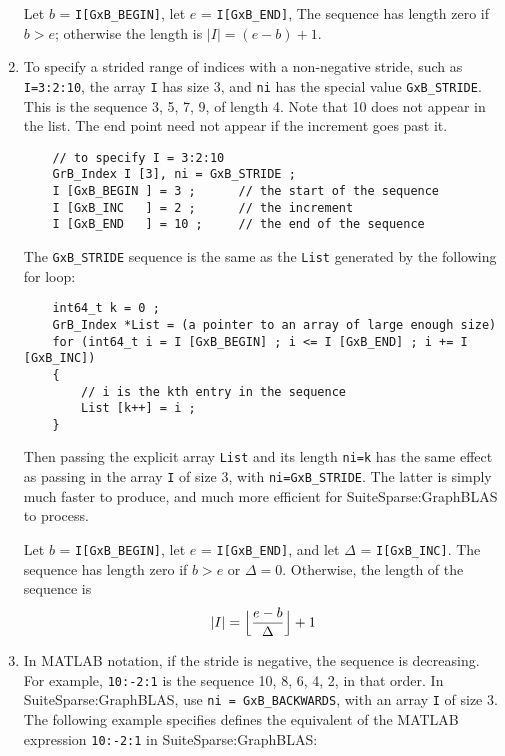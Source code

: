 \documentclass[12pt]{article}
\begin{document}
\begin{enumerate}
    \vspace{-0.05in}
    Let $b$ = \verb'I[GxB_BEGIN]', let $e$ = \verb'I[GxB_END]',
    The sequence has length zero if $b > e$; otherwise the length is
    $|I| = (e-b) + 1$.

\item To specify a strided range of indices with a non-negative stride,
    such as \verb'I=3:2:10', the array \verb'I' has size 3, and \verb'ni' has
    the special value \verb'GxB_STRIDE'.  This is the sequence 3, 5, 7, 9, of
    length 4.  Note that 10 does not appear in the list.  The end point need
    not appear if the increment goes past it.

    \vspace{-0.05in}
    {\footnotesize
    \begin{verbatim}
    // to specify I = 3:2:10
    GrB_Index I [3], ni = GxB_STRIDE ;
    I [GxB_BEGIN ] = 3 ;      // the start of the sequence
    I [GxB_INC   ] = 2 ;      // the increment
    I [GxB_END   ] = 10 ;     // the end of the sequence \end{verbatim}}

    \vspace{-0.05in}
    The \verb'GxB_STRIDE' sequence is the same as the \verb'List' generated by
    the following for loop:

    \vspace{-0.05in}
    {\footnotesize
    \begin{verbatim}
    int64_t k = 0 ;
    GrB_Index *List = (a pointer to an array of large enough size)
    for (int64_t i = I [GxB_BEGIN] ; i <= I [GxB_END] ; i += I [GxB_INC])
    {
        // i is the kth entry in the sequence
        List [k++] = i ;
    } \end{verbatim}}

    \vspace{-0.05in}
    Then passing the explicit array \verb'List' and its length \verb'ni=k' has
    the same effect as passing in the array \verb'I' of size 3, with
    \verb'ni=GxB_STRIDE'.  The latter is simply much faster to produce, and
    much more efficient for SuiteSparse:GraphBLAS to process.

    Let $b$ = \verb'I[GxB_BEGIN]', let $e$ = \verb'I[GxB_END]', and let
    $\Delta$ = \verb'I[GxB_INC]'.  The sequence has length zero if $b > e$ or
    $\Delta=0$.  Otherwise, the length of the sequence is
    \[
    |I| = \Bigl\lfloor\dfrac{e-b}{\Delta}\Bigr\rfloor + 1
    \]

\item
    In MATLAB notation, if the stride is negative, the sequence is decreasing.
    For example, \verb'10:-2:1' is the sequence 10, 8, 6, 4, 2, in that order.
    In SuiteSparse:GraphBLAS, use \verb'ni = GxB_BACKWARDS', with an array
    \verb'I' of size 3.  The following example specifies defines the equivalent
    of the MATLAB expression \verb'10:-2:1' in SuiteSparse:GraphBLAS:


\end{enumerate}
\end{document}
